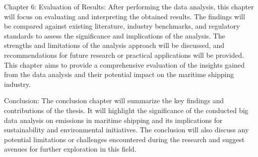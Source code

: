 \noindent Chapter 6: Evaluation of Results:
After performing the data analysis, this chapter will focus on evaluating and interpreting the obtained results.
The findings will be compared against existing literature, industry benchmarks, and regulatory standards to assess the significance and implications of the analysis.
The strengths and limitations of the analysis approach will be discussed, and recommendations for future research or practical applications will be provided.
This chapter aims to provide a comprehensive evaluation of the insights gained from the data analysis and their potential impact on the maritime shipping industry.

\noindent Conclusion:
The conclusion chapter will summarize the key findings and contributions of the thesis.
It will highlight the significance of the conducted big data analysis on emissions in maritime shipping and its implications for sustainability and environmental initiatives.
The conclusion will also discuss any potential limitations or challenges encountered during the research and suggest avenues for further exploration in this field.